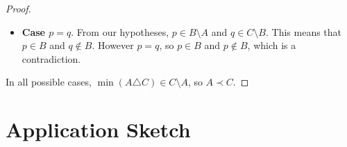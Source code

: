 \documentclass{svproc}
\begin{document}
\begin{proof}
\begin{itemize}
  \medskip

  Therefore $\min(A \triangle C) = q \in C \setminus A$.

  \medskip

  \item \textbf{Case $p = q$}. From our hypotheses, $p \in B \setminus A$ and $q \in C \setminus B$. This means that $p \in B$ and $q \notin B$. However $p=q$, so $p \in B$ and $p \notin B$, which is a contradiction.
\end{itemize}

\noindent In all possible cases, $\min(A \triangle C) \in C \setminus A$, so $A \prec C$.

\end{proof}


\section{Application Sketch}
\end{document}
